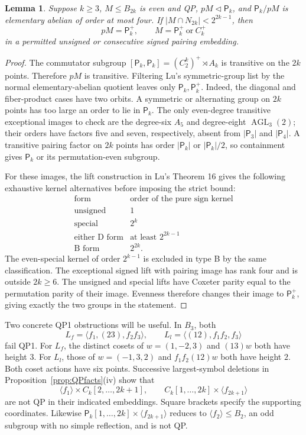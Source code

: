 \documentclass[11pt]{article}
\numberwithin{equation}{section}
\newtheorem{lemma}[theorem]{Lemma}
\theoremstyle{definition}
\DeclareMathOperator{\AGL}{AGL}
\newcommand{\pair}{\mathsf P}
\begin{document}
\begin{lemma}\label{lem:Bsmallkernel}
Suppose \(k\geq3\), \(M\leq B_{2k}\) is even and QP, \(pM\lhd\pair_k\), and \(\pair_k/pM\) is elementary abelian of order at most four.
If \(|M\cap N_{2k}|<2^{2k-1}\), then
\[
 pM=\pair_k^+,\qquad M=\pair_k^+\ \text{or}\ C_k^+
\]
in a permitted unsigned or consecutive signed pairing embedding.
\end{lemma}
\begin{proof}
The commutator subgroup
\([\pair_k,\pair_k]=(C_2^k)^+\rtimes A_k\) is transitive on the \(2k\) points.
Therefore \(pM\) is transitive.
Filtering Lu's symmetric-group list by the normal elementary-abelian quotient leaves only \(\pair_k,\pair_k^+\).
Indeed, the diagonal and fiber-product cases have two orbits.
A symmetric or alternating group on \(2k\) points has too large an order to lie in \(\pair_k\).
The only even-degree transitive exceptional images to check are the degree-six \(A_5\) and degree-eight \(\AGL_3(2)\); their orders have factors five and seven, respectively, absent from \(|\pair_3|\) and \(|\pair_4|\).
A transitive pairing factor on \(2k\) points has order \(|\pair_k|\) or \(|\pair_k|/2\), so containment gives \(\pair_k\) or its permutation-even subgroup.

For these images, the lift construction in Lu's Theorem 16 gives the following exhaustive kernel alternatives before imposing the strict bound:
\[
\begin{array}{c|c}
\text{form}&\text{order of the pure sign kernel}\\ \hline
\text{unsigned}&1\\
\text{special}&2^k\\
\text{either D form}&\text{at least }2^{2k-1}\\
\text{B form}&2^{2k}.
\end{array}
\]
The even-special kernel of order \(2^{k-1}\) is excluded in type B by the same classification.
The exceptional signed lift with pairing image has rank four and is outside \(2k\geq6\).
The unsigned and special lifts have Coxeter parity equal to the permutation parity of their image.
Evenness therefore changes their image to \(\pair_k^+\), giving exactly the two groups in the statement.
\end{proof}

Two concrete QP1 obstructions will be useful.
In \(B_3\), both
\[
 L_f=\langle f_1,(23),f_2f_3\rangle,\qquad
 L_l=\langle(12),f_1f_2,f_3\rangle
\]
fail QP1.
For \(L_f\), the distinct cosets of \(w=(1,-2,3)\) and \((13)w\) both have height \(3\).
For \(L_l\), those of \(w=(-1,3,2)\) and \(f_1f_2(12)w\) both have height \(2\).
Both coset actions have six points.
Successive largest-symbol deletions in Proposition~\ref{prop:QPfacts}(iv) show that
\begin{equation}
 \langle f_1\rangle\times C_k[2,\ldots,2k+1],
 \qquad C_k[1,\ldots,2k]\times\langle f_{2k+1}\rangle
 \label{eq:Blocal}
\end{equation}
are not QP in their indicated embeddings.
Square brackets specify the supporting coordinates.
Likewise
\(\pair_k[1,\ldots,2k]\times\langle f_{2k+1}\rangle\)
reduces to \(\langle f_2\rangle\leq B_2\), an odd subgroup with no simple reflection, and is not QP.
\end{document}
